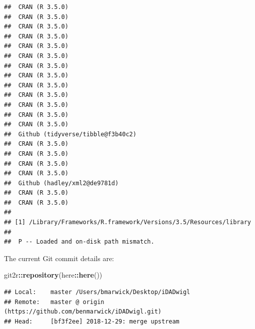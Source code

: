 \documentclass[]{elsarticle} %
\newenvironment{Shaded}{\begin{snugshade}}{\end{snugshade}}
\newcommand{\KeywordTok}[1]{\textcolor[rgb]{0.13,0.29,0.53}{\textbf{#1}}}
\newcommand{\NormalTok}[1]{#1}
\newcommand{\OperatorTok}[1]{\textcolor[rgb]{0.81,0.36,0.00}{\textbf{#1}}}
\begin{document}
\begin{verbatim}
##  CRAN (R 3.5.0)                     
##  CRAN (R 3.5.0)                     
##  CRAN (R 3.5.0)                     
##  CRAN (R 3.5.0)                     
##  CRAN (R 3.5.0)                     
##  CRAN (R 3.5.0)                     
##  CRAN (R 3.5.0)                     
##  CRAN (R 3.5.0)                     
##  CRAN (R 3.5.0)                     
##  CRAN (R 3.5.0)                     
##  CRAN (R 3.5.0)                     
##  CRAN (R 3.5.0)                     
##  CRAN (R 3.5.0)                     
##  Github (tidyverse/tibble@f3b40c2)  
##  CRAN (R 3.5.0)                     
##  CRAN (R 3.5.0)                     
##  CRAN (R 3.5.0)                     
##  CRAN (R 3.5.0)                     
##  Github (hadley/xml2@de9781d)       
##  CRAN (R 3.5.0)                     
##  CRAN (R 3.5.0)                     
## 
## [1] /Library/Frameworks/R.framework/Versions/3.5/Resources/library
## 
##  P -- Loaded and on-disk path mismatch.
\end{verbatim}

The current Git commit details are:

\begin{Shaded}
\begin{Highlighting}[]
\NormalTok{git2r}\OperatorTok{::}\KeywordTok{repository}\NormalTok{(here}\OperatorTok{::}\KeywordTok{here}\NormalTok{())}
\end{Highlighting}
\end{Shaded}

\begin{verbatim}
## Local:    master /Users/bmarwick/Desktop/iDADwigl
## Remote:   master @ origin (https://github.com/benmarwick/iDADwigl.git)
## Head:     [bf3f2ee] 2018-12-29: merge upstream
\end{verbatim}
\end{document}
